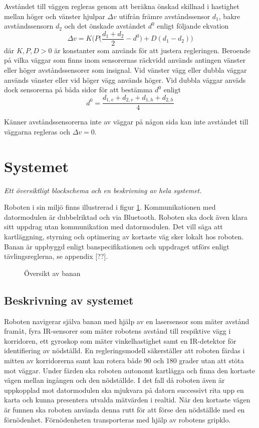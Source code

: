 \documentclass[11pt]{article}
\begin{document}
\begin{flushleft}
Avståndet till väggen regleras genom att beräkna önskad skillnad i hastighet mellan höger och vänster hjulpar $\Delta v$ utifrån främre avståndssensor $d_1$, bakre avståndssensorn $d_2$ och det önskade avståndet $d^0$ enligt följande ekvation
\begin{equation*}
	\Delta v = K \Bigg( P \Big( \frac {d_1 + d_2} {2} - d^0 \Big) + D (d_1 - d_2) \Bigg)
\end{equation*}
där $K, P, D > 0$ är konstanter som används för att justera regleringen. Beroende på vilka väggar som finns inom sensorernas räckvidd används antingen vänster eller höger avståndssensorer som insignal. Vid vänster vägg eller dubbla väggar används vänster eller vid höger vägg används höger. Vid dubbla väggar anväds dock sensorerna på båda sidor för att bestämma  $d^0$ enligt
\begin{equation*}
	d^0 = \frac {d_{1,v} + d_{2,v} + d_{1,h} + d_{2,h}} {4}
\end{equation*}

Känner avståndssensorerna inte av väggar på någon sida kan inte avståndet till väggarna regleras och $\Delta v = 0$.

\section{Systemet}
\textit{Ett översiktligt blockschema och en beskrivning av hela systemet.}

Roboten i sin miljö finns illustrerad i figur \ref{system}. Kommunikationen med datormodulen är dubbelriktad och via Bluetooth\textsuperscript{\circledR}. Roboten ska dock även klara sitt uppdrag utan kommunikation med datormodulen. Det vill säga att kartläggning, styrning och optimering av kortaste väg sker lokalt hos roboten. Banan är uppbyggd enligt banspecifikationen och uppdraget utförs enligt tävlingsreglerna, se appendix [??].

\begin{figure}[htbp]
\centering
\noindent\resizebox{.8\linewidth}{!}{
	}
	\caption{Översikt av banan\label{system}}	
\end{figure}

\subsection{Beskrivning av systemet}
Roboten navigerar själva banan med hjälp av en lasersensor som mäter avstånd framåt, fyra IR-sensorer som mäter robotens avstånd till respiktive vägg i korridoren, ett gyroskop som mäter vinkelhastighet samt en IR-detektor för identifiering av nödställd. En regleringsmodell säkerställer att roboten färdas i mitten av korridorerna samt kan rotera både 90 och 180 grader utan att stöta mot väggar. Under färden ska roboten autonomt kartlägga och finna den kortaste vägen mellan ingången och den nödställde. I det fall då roboten även är uppkopplad mot datormodulen ska mjukvara på datorn successivt rita upp en karta och kunna presentera utvalda mätvärden i realtid. När den kortaste vägen är funnen ska roboten använda denna rutt för att förse den nödställde med en förnödenhet. Förnödenheten transporteras med hjälp av robotens gripklo.


\end{flushleft}
\end{document}
